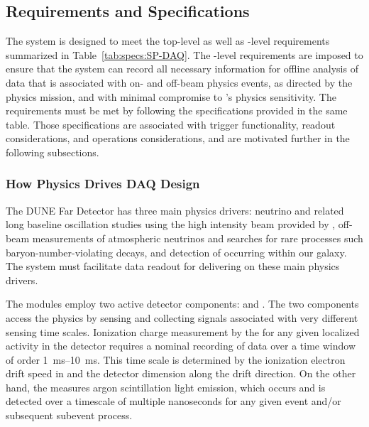 \subsection{Requirements and Specifications}
\label{sec:fd-daq:requirements}

The    system is designed to meet the
 top-level as well as -level requirements
summarized in Table~\ref{tab:specs:SP-DAQ}. The -level requirements are
imposed to ensure that the 
system %
can record all necessary information for offline 
analysis of data that is associated with on- and off-beam physics events, as directed
by the  physics mission, and with minimal compromise to
's physics sensitivity. The requirements must be met by following the 
specifications provided in the same table. Those specifications are
associated with trigger functionality, readout considerations,
and operations considerations, and are motivated further in the following subsections.

\subsubsection{How Physics Drives DAQ Design}

The DUNE Far Detector has three main physics drivers: neutrino  and related
long baseline oscillation studies using the high intensity beam provided
by \fnal, off-beam measurements of atmospheric neutrinos and searches
for rare processes such baryon-number-violating decays,
and detection of  occurring within our galaxy. The
   system must facilitate data
readout for delivering on these main physics drivers.

The   modules employ two
active detector components:  and . The two components access the physics %
by sensing and collecting signals associated with very different 
sensing time scales.
Ionization charge measurement by the  for any given
localized activity in the detector requires a
nominal recording of data over a time window of order 
\SIrange{1}{10}{\milli\second}. 
This time scale is determined by the ionization electron drift speed in
\lar and the detector dimension along the drift direction.
On the other hand, the  measures argon scintillation light emission, which
occurs and is detected over a timescale of multiple nanoseconds for
any given event and/or subsequent subevent process. 
 
